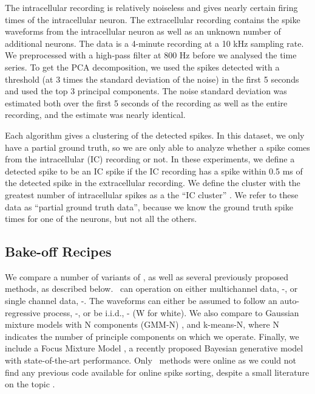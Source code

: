 The intracellular recording is relatively noiseless and gives nearly certain firing times of the intracellular neuron.  The extracellular recording contains the spike waveforms from the intracellular neuron as well as an unknown number of additional neurons.  The data is a 4-minute recording at a 10 kHz sampling rate.  We preprocessed with a high-pass filter at 800 Hz before we analysed the time series.  To get the PCA decomposition, we used the spikes detected with a threshold (at 3 times the standard deviation of the noise) in the first 5 seconds and used the top 3 principal components.  The noise standard deviation was estimated both over the first 5 seconds of the recording as well as the entire recording, and the estimate was nearly identical.

Each algorithm gives a clustering of the detected spikes.  In this dataset, we only have a partial ground truth, so we are only able to analyze whether a spike comes from the intracellular (IC) recording or not.  In these experiments, we define a detected spike to be an IC spike if the IC recording has a spike within 0.5 ms of the detected spike in the extracellular recording.  We define the cluster with the greatest number of intracellular spikes as a the ``IC cluster'' .   We refer to these data as ``partial ground truth data'', because we know the ground truth spike times for one of the neurons, but not all the others.  

\subsection{Bake-off Recipes}

We compare a number of variants of \smug, as well as several previously proposed methods, as described below.  \smug~can operation on either multichannel data, \smug-, or single channel data, \smug-.  The waveforms can either be assumed to follow an auto-regressive process, \smug-, or be i.i.d., \smug- (W for white).   We also compare to Gaussian mixture models with N components (GMM-N) , and k-means-N, where N indicates the number of principle components on which we operate.  Finally, we include a Focus Mixture Model \cite{??}, a recently proposed Bayesian generative model with state-of-the-art performance.  Only \smug~methods were online as we could not find any previous code available for online spike sorting, despite a small literature on the topic \cite{??}. 

